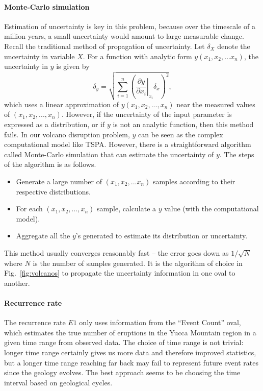 \documentclass[nofootinbib,preprint,aps]{revtex4-1}
\begin{document}
        \paragraph{Monte-Carlo simulation}
        Estimation of uncertainty is key in this problem, because over the timescale of a million years,
        a small uncertainty would amount to large measurable change. Recall the traditional method of
        propagation of uncertainty. Let $\delta_X$ denote the uncertainty in variable $X$. For a function
        with analytic form $y(x_1,x_2,...x_n)$, the uncertainty in $y$ is given by
        \begin{equation}
            \delta_y = \sqrt{\sum\limits_{i=1}^n \left(\left.\frac{\partial y}{\partial x_i}
            \right\rvert_{x_i} \delta_x\right)^2},
        \end{equation}
        which uses a linear approximation of $y(x_1,x_2,...,x_n)$ near the measured values of
        $(x_1,x_2,...,x_n)$.
        However, if the uncertainty of the input parameter is expressed as a distribution, or if $y$ is
        not an analytic function, then this method fails. In our volcano disruption
        problem, $y$ can be seen as the complex computational model like TSPA. However, there is a
        straightforward algorithm called Monte-Carlo simulation that can estimate the uncertainty of $y$.
        The steps of the algorithm is as follows.
        \begin{itemize}
            \item Generate a large number of $(x_1,x_2,...x_n)$ samples according to their respective distributions.
            \item For each $(x_1,x_2,...,x_n)$ sample, calculate a $y$ value (with the computational model).
            \item Aggregate all the $y$'s generated to estimate its distribution or uncertainty.
        \end{itemize}
        This method usually converges reasonably fast -- the error goes down as $1/\sqrt{N}$ where $N$ is the number
        of samples generated. It is the algorithm of choice in Fig.~\ref{fig:volcanos} to
        propagate the uncertainty information in one oval to another.
        \paragraph{Recurrence rate} The recurrence rate $E1$ only uses information from the ``Event Count''
        oval, which estimates the true number of eruptions in the Yucca Mountain region in a given time range
        from observed data. The choice of time range is not trivial: longer time range certainly gives us
        more data and therefore improved statistics, but a longer time range reaching far back may fail to represent
        future event rates since the geology evolves. The best approach seems to be choosing the time interval
        based on geological cycles.
\end{document}
